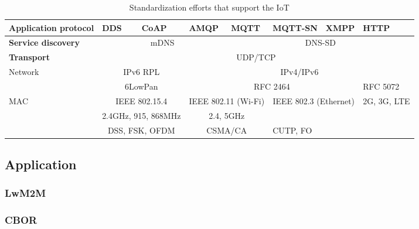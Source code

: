 \begin{table}[h!]
\scriptsize
	\begin{tabular}{l|l|l|l|l|l|l|l}

	\bf{Application protocol}& DDS                                     & CoAP                              & AMQP                              & MQTT                                & MQTT-SN & XMPP & HTTP\\\hline
	\bf{Service discovery}   & \multicolumn{3}{c}{mDNS}                & \multicolumn{4}{c}{DNS-SD}                                                                                                         \\
	\bf{Transport}           & \multicolumn{7}{c}{UDP/TCP}                                                    \\
	Network                  & \multicolumn{2}{c}{IPv6 RPL}            & \multicolumn{5}{c}{IPv4/IPv6}                            \\\hline
	\                        & \multicolumn{2}{c}{6LowPan}             & \multicolumn{4}{c}{RFC 2464}                & RFC 5072   \\\hline
	MAC                      & \multicolumn{2}{c}{IEEE 802.15.4}       & \multicolumn{2}{c}{IEEE 802.11 (Wi-Fi)} & \multicolumn{2}{c}{IEEE 802.3 (Ethernet)} & 2G, 3G, LTE\\\hline
	\                        & \multicolumn{2}{c}{2.4GHz, 915, 868MHz} & \multicolumn{2}{c}{2.4, 5GHz}           &         &              &            \\\hline
	\                        & \multicolumn{2}{c}{DSS, FSK, OFDM }     & \multicolumn{2}{c}{CSMA/CA}             & CUTP, FO               &            \\\hline
	\end{tabular}
	\caption{\label{tab:Table} Standardization efforts that support the IoT}
\end{table}


\subsection{Application}


\subsubsection{LwM2M}
\subsubsection{CBOR}
